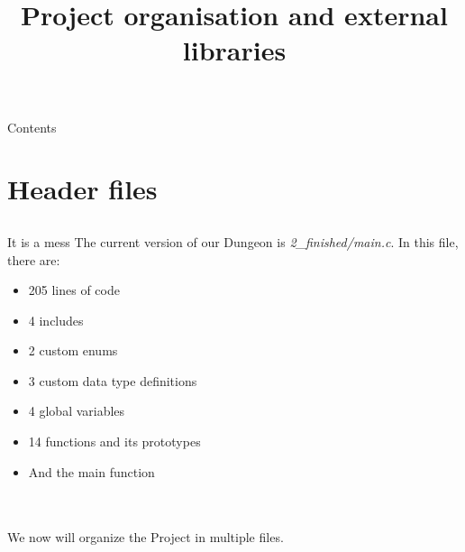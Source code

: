 
\newcommand{\topic}{
	Project organisation and external libraries
}

\title{\topic}
\supertitle{\course}
\date{}



\maketitle

\begin{frame}{Contents}
	\tableofcontents
\end{frame}

\section{Header files}
\subsection{}
\begin{frame}{It is a mess}
	The current version of our Dungeon is \textit{2\_finished/main.c}. In this file, there are:
	\begin{itemize}
		\item 205 lines of code
		\item 4 includes
		\item 2 custom enums
		\item 3 custom data type definitions
		\item 4 global variables
		\item 14 functions and its prototypes
		\item And the main function
	\end{itemize}\ \\\ \\
	We now will organize the Project in multiple files.
\end{frame}

